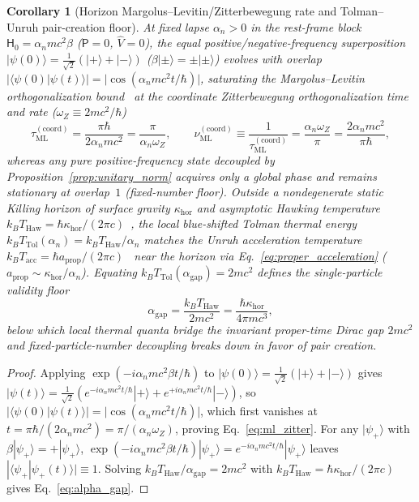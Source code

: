 \documentclass[aps,prd,onecolumn,tightenlines,nofootinbib,notitlepage,11pt,floatfix]{revtex4-2}
\theoremstyle{indentedtheorem}
\newtheorem{corollary}{Corollary}
\begin{document}
\begin{corollary}[Horizon Margolus--Levitin/Zitterbewegung rate and Tolman--Unruh pair-creation floor]
\label{cor:horizon_zitter_gap}
At fixed lapse $\alpha_n>0$ in the rest-frame block $\mathsf{H}_0 = \alpha_n mc^2\beta$ ($\mathsf{P}=0$, $\hat{V}=0$), the equal positive/negative-frequency superposition $|\psi(0)\rangle = \tfrac{1}{\sqrt{2}}(|+\rangle+|-\rangle)$ ($\beta|\pm\rangle = \pm|\pm\rangle$) evolves with overlap $|\langle\psi(0)|\psi(t)\rangle| = |\cos(\alpha_n mc^2 t/\hbar)|$, saturating the Margolus--Levitin orthogonalization bound~\citep{Margolus1998Maximum} at the coordinate Zitterbewegung orthogonalization time and rate ($\omega_Z\equiv 2mc^2/\hbar$)
\begin{equation}
    \tau_\text{ML}^{(\text{coord})} = \frac{\pi\hbar}{2\alpha_n mc^2} = \frac{\pi}{\alpha_n\omega_Z} , \qquad
    \nu_\text{ML}^{(\text{coord})} \equiv \frac{1}{\tau_\text{ML}^{(\text{coord})}} = \frac{\alpha_n\omega_Z}{\pi} = \frac{2\alpha_n mc^2}{\pi\hbar} ,
    \label{eq:ml_zitter}
\end{equation}
whereas any pure positive-frequency state decoupled by Proposition~\ref{prop:unitary_norm} acquires only a global phase and remains stationary at overlap~$1$ (fixed-number floor). Outside a nondegenerate static Killing horizon of surface gravity $\kappa_\text{hor}$ and asymptotic Hawking temperature $k_B T_\text{Haw} = \hbar\kappa_\text{hor}/(2\pi c)$~\citep{Hawking1975Particle}, the local blue-shifted Tolman thermal energy $k_B T_\text{Tol}(\alpha_n) = k_B T_\text{Haw}/\alpha_n$ matches the Unruh acceleration temperature $k_B T_\text{acc} = \hbar a_\text{prop}/(2\pi c)$~\citep{Unruh1976Notes} near the horizon via Eq.~\eqref{eq:proper_acceleration} ($a_\text{prop}\sim\kappa_\text{hor}/\alpha_n$). Equating $k_B T_\text{Tol}(\alpha_\text{gap}) = 2mc^2$ defines the single-particle validity floor
\begin{equation}
    \alpha_\text{gap} = \frac{k_B T_\text{Haw}}{2mc^2} = \frac{\hbar\kappa_\text{hor}}{4\pi mc^3} ,
    \label{eq:alpha_gap}
\end{equation}
below which local thermal quanta bridge the invariant proper-time Dirac gap $2mc^2$ and fixed-particle-number decoupling breaks down in favor of pair creation.
\end{corollary}
\begin{proof}
Applying $\exp(-i\alpha_n mc^2\beta t/\hbar)$ to $|\psi(0)\rangle = \tfrac{1}{\sqrt{2}}(|+\rangle+|-\rangle)$ gives $|\psi(t)\rangle = \tfrac{1}{\sqrt{2}}(e^{-i\alpha_n mc^2 t/\hbar}|+\rangle + e^{+i\alpha_n mc^2 t/\hbar}|-\rangle)$, so $|\langle\psi(0)|\psi(t)\rangle| = |\cos(\alpha_n mc^2 t/\hbar)|$, which first vanishes at $t = \pi\hbar/(2\alpha_n mc^2) = \pi/(\alpha_n\omega_Z)$, proving Eq.~\eqref{eq:ml_zitter}. For any $|\psi_+\rangle$ with $\beta|\psi_+\rangle = +|\psi_+\rangle$, $\exp(-i\alpha_n mc^2\beta t/\hbar)|\psi_+\rangle = e^{-i\alpha_n mc^2 t/\hbar}|\psi_+\rangle$ leaves $|\langle\psi_+|\psi_+(t)\rangle| \equiv 1$. Solving $k_B T_\text{Haw}/\alpha_\text{gap} = 2mc^2$ with $k_B T_\text{Haw} = \hbar\kappa_\text{hor}/(2\pi c)$ gives Eq.~\eqref{eq:alpha_gap}.
\end{proof}
\end{document}
